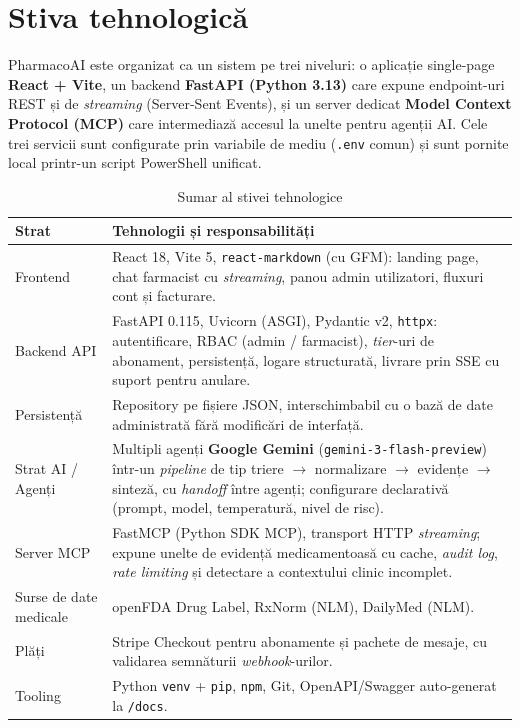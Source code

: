 \section{Stiva tehnologică}

PharmacoAI este organizat ca un sistem pe trei niveluri: o aplicație single-page \textbf{React + Vite}, un backend \textbf{FastAPI (Python 3.13)} care expune endpoint-uri REST și de \textit{streaming} (Server-Sent Events), și un server dedicat \textbf{Model Context Protocol (MCP)} care intermediază accesul la unelte pentru agenții AI. Cele trei servicii sunt configurate prin variabile de mediu (\texttt{.env} comun) și sunt pornite local printr-un script PowerShell unificat.

\begin{table}[H]
\centering
\small
\renewcommand{\arraystretch}{1.15}
\begin{tabular}{p{3.2cm}p{11cm}}
\toprule
\textbf{Strat} & \textbf{Tehnologii și responsabilități} \\
\midrule
Frontend & React 18, Vite 5, \texttt{react-markdown} (cu GFM): landing page, chat farmacist cu \textit{streaming}, panou admin utilizatori, fluxuri cont și facturare. \\
Backend API & FastAPI 0.115, Uvicorn (ASGI), Pydantic v2, \texttt{httpx}: autentificare, RBAC (admin / farmacist), \textit{tier}-uri de abonament, persistență, logare structurată, livrare prin SSE cu suport pentru anulare. \\
Persistență & Repository pe fișiere JSON, interschimbabil cu o bază de date administrată fără modificări de interfață. \\
Strat AI / Agenți & Multipli agenți \textbf{Google Gemini} (\texttt{gemini-3-flash-preview}) într-un \textit{pipeline} de tip triere $\rightarrow$ normalizare $\rightarrow$ evidențe $\rightarrow$ sinteză, cu \textit{handoff} între agenți; configurare declarativă (prompt, model, temperatură, nivel de risc). \\
Server MCP & FastMCP (Python SDK MCP), transport HTTP \textit{streaming}; expune unelte de evidență medicamentoasă cu cache, \textit{audit log}, \textit{rate limiting} și detectare a contextului clinic incomplet. \\
Surse de date medicale & openFDA Drug Label, RxNorm (NLM), DailyMed (NLM). \\
Plăți & Stripe Checkout pentru abonamente și pachete de mesaje, cu validarea semnăturii \textit{webhook}-urilor. \\
Tooling & Python \texttt{venv} + \texttt{pip}, \texttt{npm}, Git, OpenAPI/Swagger auto-generat la \texttt{/docs}. \\
\bottomrule
\end{tabular}
\caption{Sumar al stivei tehnologice}
\label{tab:stack}
\end{table}

